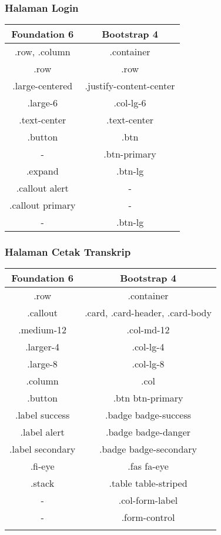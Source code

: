 \subsubsection{Halaman Login}
\begin{tabular}{|c|c|} 
	\hline
	\textbf{Foundation 6} & \textbf{Bootstrap 4}  \\ [0.5ex] 
	\hline\hline
	.row, .column &.container    \\ 
	\hline	
	.row &.row     \\  
	\hline
	 .large-centered &.justify-content-center \\  
	 \hline
	 .large-6 &.col-lg-6    \\ 
	 \hline
	 .text-center & .text-center   \\ 
	 \hline
	 .button & .btn   \\ 
	 \hline
	 - & .btn-primary   \\ 
	\hline
	.expand & .btn-lg  \\ 
	\hline
	.callout alert & -  \\ 
	\hline
	.callout primary & -  \\ 
	\hline
	- & .btn-lg   \\ [1ex] 
	\hline
\end{tabular}

\subsubsection{Halaman Cetak Transkrip}
\begin{tabular}{|c|c|} 
	\hline
	\textbf{Foundation 6} & \textbf{Bootstrap 4}  \\ [0.5ex] 
	\hline\hline
	.row &   .container\\ 
	\hline	
	.callout &  .card, .card-header, .card-body \\
	\hline	
	.medium-12 &  .col-md-12 \\
	\hline	
	.larger-4 &  .col-lg-4 \\
	\hline
	.large-8 &  .col-lg-8 \\
	\hline
	.column &  .col \\	
	\hline	
	.button &  .btn btn-primary\\
	\hline	
	.label success &  .badge badge-success \\
	\hline	
	.label alert & .badge badge-danger  \\
	\hline	
	.label secondary & .badge badge-secondary  \\
	\hline	
	.fi-eye &  .fas fa-eye \\	
	\hline	
	.stack & .table table-striped  \\
	\hline	
	- & .col-form-label  \\ 
	\hline	
	- & .form-control  \\
	\hline	
	&   \\ [1ex] 
	\hline
\end{tabular}

